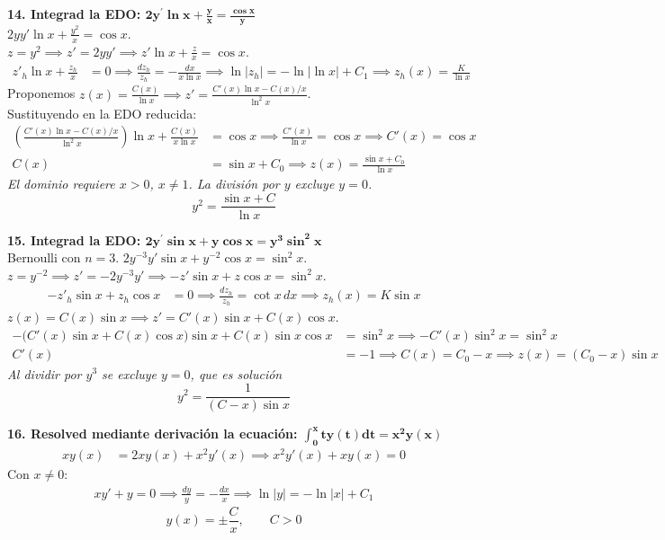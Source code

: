 \documentclass[11pt, a4paper]{article}
\begin{document}
\noindent\textbf{14. Integrad la EDO: $\bm{2y^{\prime}\ln x+\frac{y}{x}=\frac{\cos x}{y}}$} \\
$2y y' \ln x + \frac{y^2}{x} = \cos x$. \\
$z = y^2 \implies z' = 2y y' \implies z' \ln x + \frac{z}{x} = \cos x$. \\
\begin{align*}
z'_h \ln x + \frac{z_h}{x} &= 0 \implies \frac{dz_h}{z_h} = -\frac{dx}{x\ln x} \implies \ln|z_h| = -\ln|\ln x| + C_1 \implies z_h(x) = \frac{K}{\ln x}
\end{align*}
Proponemos $z(x) = \frac{C(x)}{\ln x} \implies z' = \frac{C'(x)\ln x - C(x)/x}{\ln^2 x}$. \\
Sustituyendo en la EDO reducida:
\begin{align*}
\left(\frac{C'(x)\ln x - C(x)/x}{\ln^2 x}\right)\ln x + \frac{C(x)}{x\ln x} &= \cos x \implies \frac{C'(x)}{\ln x} = \cos x \implies C'(x) = \cos x \\
C(x) &= \sin x + C_0 \implies z(x) = \frac{\sin x + C_0}{\ln x}
\end{align*}
\textit{El dominio requiere $x > 0$, $x \neq 1$. La división por $y$ excluye $y=0$.}
\[
\boxed{y^2 = \frac{\sin x + C}{\ln x}}
\]


\noindent\textbf{15. Integrad la EDO: $\bm{2y^{\prime}\sin x+y\cos x=y^{3}\sin^{2}x}$} \\
Bernoulli con $n=3$. $2y^{-3}y'\sin x + y^{-2}\cos x = \sin^2 x$. \\
$z = y^{-2} \implies z' = -2y^{-3}y' \implies -z'\sin x + z\cos x = \sin^2 x$. \\
\begin{align*}
-z'_h \sin x + z_h \cos x &= 0 \implies \frac{dz_h}{z_h} = \cot x\,dx \implies z_h(x) = K \sin x
\end{align*}
$z(x) = C(x)\sin x \implies z' = C'(x)\sin x + C(x)\cos x$. \\
\begin{align*}
-\big(C'(x)\sin x + C(x)\cos x\big)\sin x + C(x)\sin x\cos x &= \sin^2 x \implies -C'(x)\sin^2 x = \sin^2 x \\
C'(x) &= -1 \implies C(x) = C_0 - x \implies z(x) = (C_0 - x)\sin x
\end{align*}
\textit{Al dividir por $y^3$ se excluye $y=0$, que es solución }
\[
\boxed{y^2 = \frac{1}{(C - x)\sin x}}
\]


\noindent\textbf{16. Resolved mediante derivación la ecuación: $\bm{\int_{0}^{x}ty(t)dt=x^{2}y(x)}$} \\
\begin{align*}
x y(x) &= 2x y(x) + x^2 y'(x) \implies x^2 y'(x) + x y(x) = 0
\end{align*}
Con $x \neq 0$:
\begin{align*}
x y' + y = 0 \implies \frac{dy}{y} = -\frac{dx}{x} \implies \ln|y| = -\ln|x| + C_1
\end{align*}
\[
\boxed{y(x) = \pm\frac{C}{x}, \qquad C>0}
\]
\end{document}
